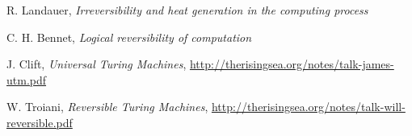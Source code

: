 \documentclass[12pt]{article}
\theoremstyle{plain}
\theoremstyle{definition}
\begin{document}
	\begin{thebibliography}{9}
		 R. Landauer, \emph{Irreversibility and heat generation in the computing process}
		
		 C. H. Bennet, \emph{Logical reversibility of computation}
		
		 J. Clift, \emph{Universal Turing Machines}, \url{http://therisingsea.org/notes/talk-james-utm.pdf}
		
		 W. Troiani, \emph{Reversible Turing Machines}, \url{http://therisingsea.org/notes/talk-will-reversible.pdf}
	\end{thebibliography}
	
	
	
	
	
	
	
	
	
	
	
	
	
	
	
	
	
	
	
	
	
	
\end{document}
